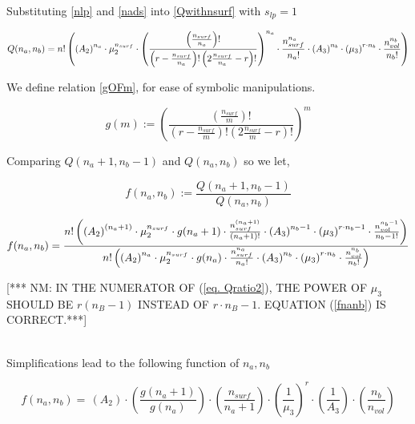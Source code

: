 \documentclass[10pt,letterpaper]{article}
\newcommand{\nads}[1]{
    \ensuremath{
        \frac{
            n_{surf}
        }{
            #1
        }
    }
}
\newcommand{\nlp}[1]{
    \ensuremath{
        r
        -
        \nads{#1}
    }
}
\newcommand{\myQ}[5]{
	\ensuremath{	
		n!
		\left(
		\left(
		A_2
		\right)^{#1}
		\cdot 
		\mu_{2}^{n_{surf}} 
		\cdot 
		#5
		\cdot
		\frac{
		        n_{surf}^{#1}
		    }{
		        #1!
		    }
		\cdot
		\left(
		    A_3
		\right)^{#2}
		\cdot 
		\left(
		    \mu_{3}
		\right)^{r\cdotp #2}
		\cdot
		\frac{
			n_{vol}^{#2}
		}{
			#2!
		}
		\right)
		}
}
\newcommand{\gOFm}[2]{
\left( \frac{
\left(\frac{#2}{#1}\right)!}{ 
\left(r-\frac{#2}{#1}\right)! 
\left(2\frac{#2}{#1}-r\right)!}
\right)^{#1}  
}
\begin{document}
\newpage
\noindent Substituting \ref{nlp} and \ref{nads} into \ref{Qwithnsurf}
%
%
with $s_{lp}=1$

\begin{equation}
	Q(n_a,n_b)=\myQ{n_a}{n_b}{\nads{n_a}}{(\nlp{n_a})}{\gOFm{n_a}{n_{surf}}}
	\label{eq. Qab}
\end{equation}

\noindent We define relation \ref{gOFm}, for ease of symbolic manipulations.

\begin{equation}
    \boxed{g(m):= \gOFm{m}{n_{surf}}}
    \label{gOFm}
\end{equation}


\noindent Comparing $Q(n_a+1,n_b-1)$ and $Q(n_a,n_b)$ so we let,

\begin{equation}
    \boxed{f(n_a,n_b):=\frac{Q(n_a+1,n_b-1)}{Q(n_a,n_b)}}
    \label{QfracDEF}
\end{equation}


\begin{equation}
	f(n_a,n_b)=
	\frac{
		\myQ{(n_a+1)}{n_b-1}{\nads{n_a+1}}{(\nlp{n_a+1})}{g(n_a+1)}
	}{
		\myQ{n_a}{n_b}{\nads{n_a}}{(\nlp{n_a})}{g(n_a)}
	}
	\label{eq. Qratio2}
\end{equation}

[*** NM:  IN THE NUMERATOR OF (\ref{eq. Qratio2}),
THE POWER OF $\mu_3$ SHOULD BE $r(n_B-1)$ INSTEAD
OF $r\cdot n_B-1$.  EQUATION (\ref{fnanb}) IS 
CORRECT.***]

\text{}\\

\noindent Simplifications lead to the following function of $n_a,n_b$


\begin{equation}
f(n_a,n_b)=\,
\left(
    A_2
\right)
\cdotp
\left(
	\frac{
		g(n_a+1)
	}{
		g(n_a)
	}
\right)
\cdotp
\left(
    \frac{
    	n_{surf}
    }{
    	n_a+1
    }
\right)
\cdotp
\left(
    \frac{
    	1
    }{
    	\mu_{3}
    }
    \right)^r
\cdot
\left(
    \frac{
        1
    }{
        A_3
    }
\right)
\cdot
\left(
    \frac{
    	n_{b}
    }{
    	n_{vol}	
    } 
\right)
\label{fnanb}
\end{equation}

\end{document}
